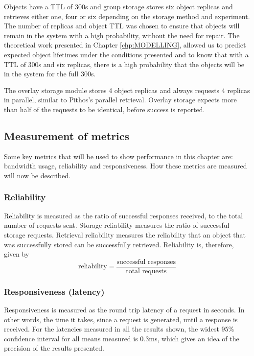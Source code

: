 Objects have a TTL of 300s and group storage stores six object replicas and retrieves either one, four or six depending on the storage method and experiment. The number of replicas and object TTL was chosen to ensure that objects will remain in the system with a high probability, without the need for repair. The theoretical work presented in Chapter \ref{chp:MODELLING}, allowed us to predict expected object lifetimes under the conditions presented and to know that with a TTL of 300s and six replicas, there is a high probability that the objects will be in the system for the full 300s.

The overlay storage module stores 4 object replicas and always requests 4 replicas in parallel, similar to Pithos's parallel retrieval. Overlay storage expects more than half of the requests to be identical, before success is reported.

\subsection{Measurement of metrics}
\label{metric_measurement}

Some key metrics that will be used to show performance in this chapter are: bandwidth usage, reliability and responsiveness. How these metrics are measured will now be described.

\subsubsection{Reliability}
Reliability is measured as the ratio of successful responses received, to the total number of requests sent. Storage reliability measures the ratio of successful storage requests. Retrieval reliability measures the reliability that an object that was successfully stored can be successfully retrieved. Reliability is, therefore, given by
%
\begin{equation}
\textrm{reliability} = \frac{\textrm{successful responses}}{\textrm{total requests}}
\end{equation}

\subsubsection{Responsiveness (latency)}

Responsiveness is measured as the round trip latency of a request in seconds.  In other words, the time it takes, since a request is generated, until a response is received. For the latencies measured in all the results shown, the widest 95\% confidence interval for all means measured is 0.3ms, which gives an idea of the precision of the results presented.

